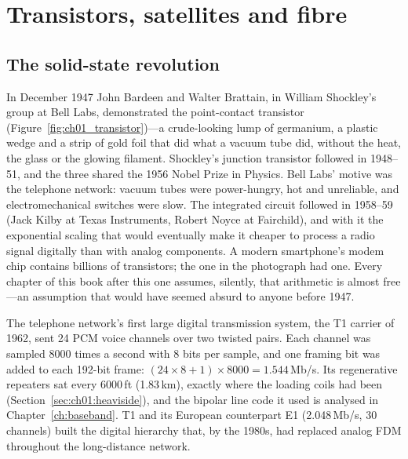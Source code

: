 \chOneNeed
\section{Transistors, satellites and fibre}
\label{sec:ch01:solidstate}

\subsection{The solid-state revolution}

In December 1947 John Bardeen and Walter Brattain, in William Shockley's group at Bell Labs,
demonstrated the point-contact transistor (Figure~\ref{fig:ch01_transistor})---a crude-looking lump of
germanium, a plastic wedge and a strip of gold foil that did what a vacuum tube did, without the
heat, the glass or the glowing filament. Shockley's junction transistor followed in 1948--51, and the
three shared the 1956 Nobel Prize in Physics. Bell Labs' motive was the telephone network: vacuum tubes
were power-hungry, hot and unreliable, and electromechanical switches were slow. The integrated circuit
followed in 1958--59 (Jack Kilby at Texas Instruments, Robert Noyce at Fairchild), and with it the
exponential scaling that would eventually make it cheaper to process a radio signal digitally than with
analog components. A modern smartphone's modem chip contains billions of transistors; the one in the
photograph had one. Every chapter of this book after this one assumes, silently, that arithmetic is
almost free---an assumption that would have seemed absurd to anyone before 1947.

The telephone network's first large digital transmission system, the T1 carrier of 1962, sent 24 PCM
voice channels over two twisted pairs. Each channel was sampled 8000 times a second with 8 bits per
sample, and one framing bit was added to each 192-bit frame:
$(24\times8+1)\times8000 = 1.544$\,Mb/s. Its regenerative repeaters sat every 6000\,ft (1.83\,km),
exactly where the loading coils had been (Section~\ref{sec:ch01:heaviside}), and the bipolar line code it
used is analysed in Chapter~\ref{ch:baseband}. T1 and its European counterpart E1 (2.048\,Mb/s, 30 channels)
built the digital hierarchy that, by the 1980s, had replaced analog FDM throughout the long-distance
network.

